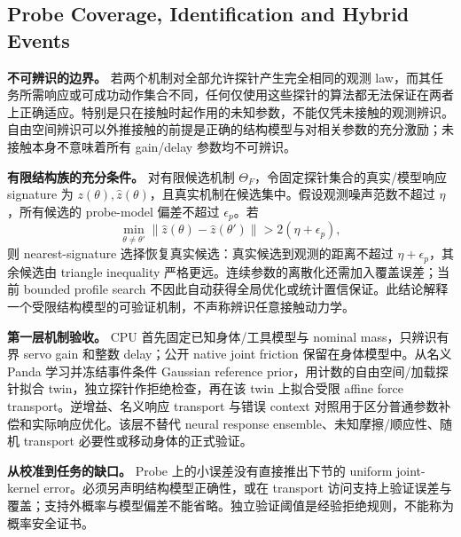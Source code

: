 \documentclass[11pt]{article}
\begin{document}
\subsection{Probe Coverage, Identification and Hybrid Events}
\textbf{不可辨识的边界。} 若两个机制对全部允许探针产生完全相同的观测 law，而其任务所需响应或可成功动作集合不同，任何仅使用这些探针的算法都无法保证在两者上正确适应。特别是只在接触时起作用的未知参数，不能仅凭未接触的观测辨识。自由空间辨识可以外推接触的前提是正确的结构模型与对相关参数的充分激励；未接触本身不意味着所有 gain/delay 参数均不可辨识。

\textbf{有限结构族的充分条件。} 对有限候选机制 $\Theta_F$，令固定探针集合的真实/模型响应 signature 为 $z(\theta),\hat z(\theta)$，且真实机制在候选集中。假设观测噪声范数不超过 $\eta$，所有候选的 probe-model 偏差不超过 $\epsilon_p$。若
\begin{equation}
 \min_{\theta\ne\theta'}\|\hat z(\theta)-\hat z(\theta')\|>2(\eta+\epsilon_p),
\end{equation}
则 nearest-signature 选择恢复真实候选：真实候选到观测的距离不超过 $\eta+\epsilon_p$，其余候选由 triangle inequality 严格更远。连续参数的离散化还需加入覆盖误差；当前 bounded profile search 不因此自动获得全局优化或统计置信保证。此结论解释一个受限结构模型的可验证机制，不声称辨识任意接触动力学。

\textbf{第一层机制验收。} CPU 首先固定已知身体/工具模型与 nominal mass，只辨识有界 servo gain 和整数 delay；公开 native joint friction 保留在身体模型中。从名义 Panda 学习并冻结事件条件 Gaussian reference prior，用计数的自由空间/加载探针拟合 twin，独立探针作拒绝检查，再在该 twin 上拟合受限 affine force transport。逆增益、名义响应 transport 与错误 context 对照用于区分普通参数补偿和实际响应优化。该层不替代 neural response ensemble、未知摩擦/顺应性、随机 transport 必要性或移动身体的正式验证。

\textbf{从校准到任务的缺口。} Probe 上的小误差没有直接推出下节的 uniform joint-kernel error。必须另声明结构模型正确性，或在 transport 访问支持上验证误差与覆盖；支持外概率与模型偏差不能省略。独立验证阈值是经验拒绝规则，不能称为概率安全证书。
\end{document}
